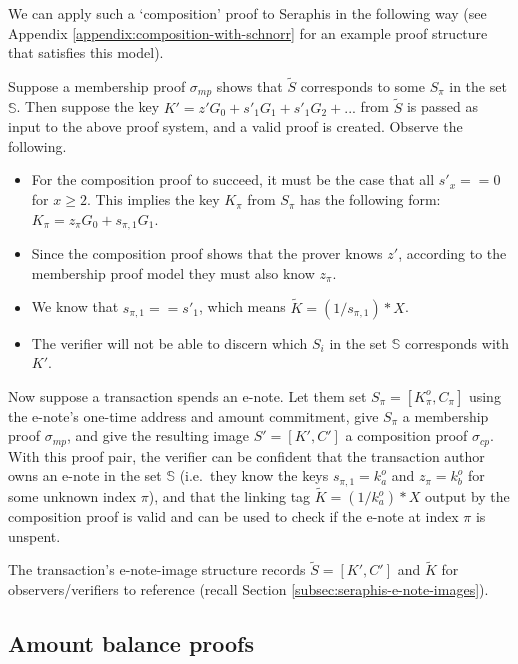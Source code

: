 We can apply such a `composition' proof to Seraphis in the following way (see Appendix \ref{appendix:composition-with-schnorr} for an example proof structure that satisfies this model).

Suppose a membership proof $\sigma_{mp}$ shows that $\tilde{S}$ corresponds to some $S_{\pi}$ in the set $\mathbb{S}$. Then suppose the key $K' = z' G_0 + s'_1 G_1 + s'_1 G_2 + ...$ from $\tilde{S}$ is passed as input to the above proof system, and a valid proof is created. Observe the following.

\begin{itemize}
    \item For the composition proof to succeed, it must be the case that all $s'_x == 0$ for $x \geq 2$. This implies the key $K_{\pi}$ from $S_{\pi}$ has the following form: $K_{\pi} = z_{\pi} G_0 + s_{\pi, 1} G_1$.

    \item Since the composition proof shows that the prover knows $z'$, according to the membership proof model they must also know $z_{\pi}$.

    \item We know that $s_{\pi, 1} == s'_1$, which means $\tilde{K} = (1/ s_{\pi, 1})*X$.

    \item The verifier will not be able to discern which $S_i$ in the set $\mathbb{S}$ corresponds with $K'$.
\end{itemize}

Now suppose a transaction spends an e-note. Let them set $S_{\pi} = [K^o_{\pi}, C_{\pi}]$ using the e-note's one-time address and amount commitment, give $S_{\pi}$ a membership proof $\sigma_{mp}$, and give the resulting image $S' = [K', C']$ a composition proof $\sigma_{cp}$. With this proof pair, the verifier can be confident that the transaction author owns an e-note in the set $\mathbb{S}$ (i.e.\ they know the keys $s_{\pi,1} = k^o_a$ and $z_{\pi} = k^o_b$ for some unknown index $\pi$), and that the linking tag $\tilde{K} = (1/k^o_a)*X$ output by the composition proof is valid and can be used to check if the e-note at index $\pi$ is unspent.

The transaction's e-note-image structure records $\tilde{S} = [K', C']$ and $\tilde{K}$ for observers/verifiers to reference (recall Section \ref{subsec:seraphis-e-note-images}).


\subsection{Amount balance proofs}
\label{subsec:seraphis-amount-balance-proofs}

